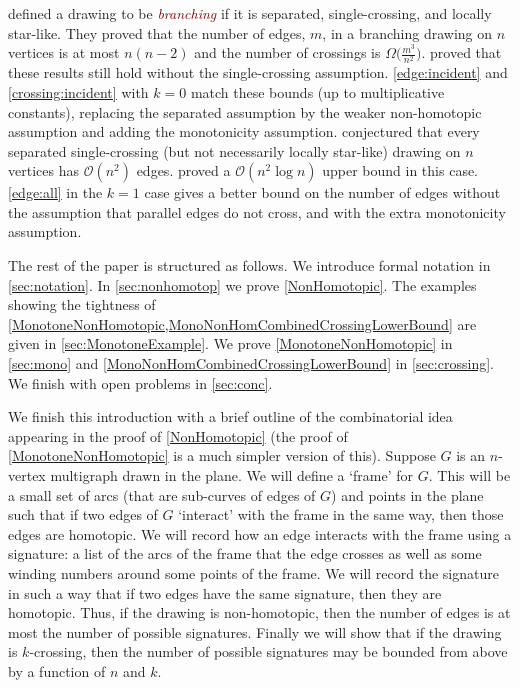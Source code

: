 \documentclass[a4paper,11pt]{article}
\newcommand{\defn}[1]{\textcolor{Maroon}{\emph{#1}}}
\newcommand{\OO}{\mathcal{O}}
\begin{document}
 defined a drawing to be \defn{branching} if it is separated, single-crossing, and locally star-like. They proved that the number of edges, $m$, in a branching drawing on $n$ vertices is at most $n(n - 2)$ and the number of crossings is $\Omega\bigl(\frac{m^3}{n^2}\bigr)$.  proved that these results still hold without the single-crossing assumption. \ref{edge:incident} and \ref{crossing:incident} with $k = 0$ match these bounds (up to multiplicative constants), replacing the separated assumption by the weaker non-homotopic assumption and adding the monotonicity assumption. 
 conjectured that every separated single-crossing (but not necessarily locally star-like) drawing on $n$ vertices has $\OO(n^2)$ edges.  proved a $\OO(n^2\log n)$ upper bound in this case. \ref{edge:all} in the $k = 1$ case gives a better bound on the number of edges without the assumption that parallel edges do not cross, and with the extra monotonicity assumption. 

The rest of the paper is structured as follows. We introduce formal notation in \cref{sec:notation}. In \cref{sec:nonhomotop} we prove \cref{NonHomotopic}. The examples showing the tightness of \cref{MonotoneNonHomotopic,MonoNonHomCombinedCrossingLowerBound} are given in \cref{sec:MonotoneExample}. We prove \cref{MonotoneNonHomotopic} in \cref{sec:mono} and \cref{MonoNonHomCombinedCrossingLowerBound} in \cref{sec:crossing}. We finish with open problems in \cref{sec:conc}.

We finish this introduction with a brief outline of the combinatorial idea appearing in the proof of \cref{NonHomotopic} (the proof of \cref{MonotoneNonHomotopic} is a much simpler version of this). Suppose $G$ is an $n$-vertex multigraph drawn in the plane. We will define a `frame' for $G$. This will be a small set of arcs (that are sub-curves of edges of $G$) and points in the plane such that if two edges of $G$ `interact' with the frame in the same way, then those edges are homotopic. We will record how an edge interacts with the frame using a signature: a list of the arcs of the frame that the edge crosses as well as some winding numbers around some points of the frame. We will record the signature in such a way that if two edges have the same signature, then they are homotopic. 
Thus, if the drawing is non-homotopic, then the number of edges is at most the number of possible signatures. Finally we will show that if the drawing is $k$-crossing, then the number of possible signatures may be bounded from above by a function of $n$ and $k$.
\end{document}
